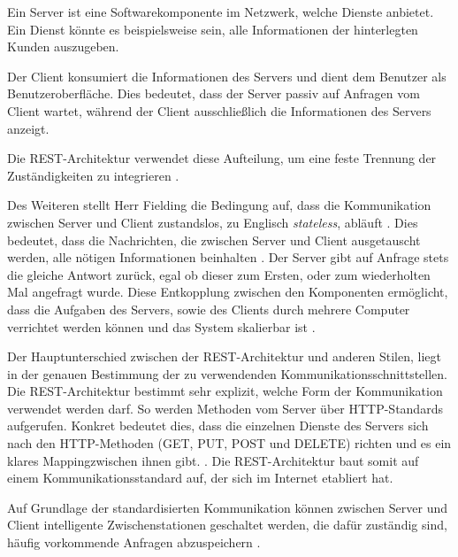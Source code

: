Ein Server ist eine Softwarekomponente im Netzwerk, welche Dienste anbietet. Ein Dienst könnte es beispielsweise sein, alle Informationen der hinterlegten Kunden auszugeben.

Der Client konsumiert die Informationen des Servers und dient dem Benutzer als Benutzeroberfläche. Dies bedeutet, dass der Server passiv auf Anfragen vom Client wartet, während der Client ausschließlich die Informationen des Servers anzeigt. 

Die REST-Architektur verwendet diese Aufteilung, um eine feste Trennung der Zuständigkeiten zu integrieren \parencite[vgl.][S. 78]{fielding_architectural_2000}.

Des Weiteren stellt Herr Fielding die Bedingung auf, dass die Kommunikation zwischen Server und Client zustandslos, zu Englisch \textit{stateless}, abläuft \parencite[][S. 78]{fielding_architectural_2000}. Dies bedeutet, dass die Nachrichten, die zwischen Server und Client ausgetauscht werden, alle nötigen Informationen beinhalten \parencite[][S. 128]{starke_effektive_2015}. Der Server gibt auf Anfrage stets die gleiche Antwort zurück, egal ob dieser zum Ersten, oder zum wiederholten Mal angefragt wurde. Diese Entkopplung zwischen den Komponenten ermöglicht, dass die Aufgaben des Servers, sowie des Clients durch mehrere Computer verrichtet werden können und das System skalierbar ist \parencite[][S. 79]{fielding_architectural_2000}.

Der Hauptunterschied zwischen der REST-Architektur und anderen Stilen, liegt in der genauen Bestimmung der zu verwendenden Kommunikationsschnittstellen. Die REST-Architektur bestimmt sehr explizit, welche Form der Kommunikation verwendet werden darf. So werden Methoden vom Server über HTTP-Standards aufgerufen. Konkret bedeutet dies, dass die einzelnen Dienste des Servers sich nach den HTTP-Methoden (GET, PUT, POST und DELETE) richten und es ein klares Mapping\footnotemark zwischen ihnen gibt. \parencite[vgl.][S. 128]{starke_effektive_2015}. Die REST-Architektur baut somit auf einem Kommunikationsstandard auf, der sich im Internet etabliert hat.


Auf Grundlage der standardisierten Kommunikation können zwischen Server und Client intelligente Zwischenstationen geschaltet werden, die dafür zuständig sind, häufig vorkommende Anfragen abzuspeichern \parencites[vgl.][S. 79 f.]{fielding_architectural_2000}[][S. 128]{starke_effektive_2015}.

